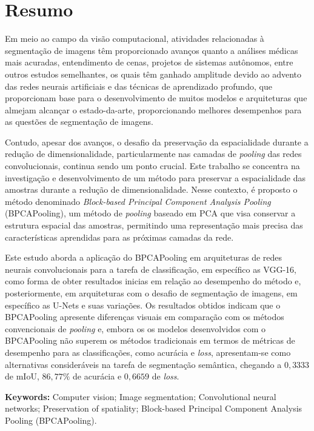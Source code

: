\section*{Resumo}
\thispagestyle{empty}
\makeatletter
\makeatother
Em meio ao campo da visão computacional, atividades relacionadas à segmentação de imagens têm proporcionado avanços quanto a análises médicas mais acuradas, entendimento de cenas, projetos de sistemas autônomos, entre outros estudos semelhantes, os quais têm ganhado amplitude devido ao advento das redes neurais artificiais e das técnicas de aprendizado profundo, que proporcionam base para o desenvolvimento de muitos modelos e arquiteturas que almejam alcançar o estado-da-arte, proporcionando melhores desempenhos para as questões de segmentação de imagens.

Contudo, apesar dos avanços, o desafio da preservação da espacialidade durante a redução de dimensionalidade, particularmente nas camadas de \textit{pooling} das redes convolucionais, continua sendo um ponto crucial. Este trabalho se concentra na investigação e desenvolvimento de um método para preservar a espacialidade das amostras durante a redução de dimensionalidade. Nesse contexto, é proposto o método denominado \textit{Block-based Principal Component Analysis Pooling} (BPCAPooling), um método de \textit{pooling} baseado em PCA que visa conservar a estrutura espacial das amostras, permitindo uma representação mais precisa das características aprendidas para as próximas camadas da rede.

Este estudo aborda a aplicação do BPCAPooling em arquiteturas de redes neurais convolucionais para a tarefa de classificação, em específico as VGG-16, como forma de obter resultados inicias em relação ao desempenho do método e, posteriormente, em arquiteturas com o desafio de segmentação de imagens, em específico as U-Nets e suas variações. Os resultados obtidos indicam que o BPCAPooling apresente diferenças visuais em comparação com os métodos convencionais de \textit{pooling} e, embora os os modelos desenvolvidos com o BPCAPooling não superem os métodos tradicionais em termos de métricas de desempenho para as classificações, como acurácia e \textit{loss}, apresentam-se como alternativas consideráveis na tarefa de segmentação semântica, chegando a $0,3333$ de mIoU, $86,77\%$ de acurácia e $0,6659$ de \textit{loss}.

\textbf{Keywords:} Computer vision; Image segmentation; Convolutional neural networks; Preservation of spatiality; Block-based Principal Component Analysis Pooling (BPCAPooling).
